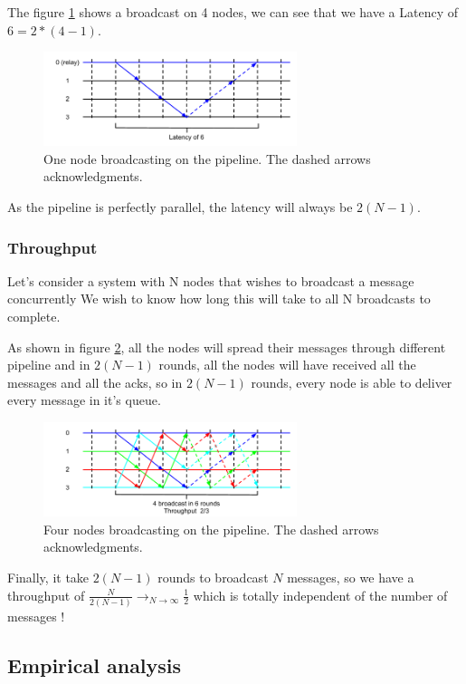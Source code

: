 \documentclass[a4paper]{article}
\begin{document}
The figure \ref{figure:latency2} shows a broadcast on 4 nodes, we can see that
we have a Latency of$6=2*(4-1)$.

\begin{figure}[h]
    \centering
    \includegraphics[width=280px]{Latency2.png}
    \caption{One node broadcasting on the pipeline. The dashed arrows
    acknowledgments.}
    \label{figure:latency2}
\end{figure}

As the pipeline is perfectly parallel, the latency will always be $2(N-1)$.
\subsubsection{Throughput}
Let’s consider a system with N nodes that wishes to broadcast a message concurrently
We wish to know how long this will take to all N broadcasts to
complete.

As shown in figure \ref{figure:throughput2}, all the nodes will spread their
messages through different pipeline and in $2(N-1)$ rounds, all the
nodes will have received all the messages and all the acks, so in $2(N-1)$ rounds,
every node is able to deliver every message in it's queue.

\begin{figure}[h]
    \centering
    \includegraphics[width=280px]{Throughput2.png}
    \caption{Four nodes broadcasting on the pipeline. The dashed arrows
    acknowledgments.}
    \label{figure:throughput2}
\end{figure}

Finally, it take $2(N-1)$ rounds to broadcast $N$ messages, so we have a throughput
of $\frac{N}{2(N-1)}\longrightarrow_{N \rightarrow \infty}\frac{1}{2}$ which is totally independent of the number of
messages !

\subsection{Empirical analysis}
\end{document}

